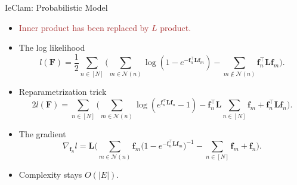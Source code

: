 \documentclass{beamer}
\newcommand{\sumgraph}{\underset{n \in [N]}{\sum}}
\def \sumneighbors {\underset {m\in{\mathcal{N}(n)}}{\sum}}
\def \sumstrangers{\underset {m\notin{\mathcal{N}(n)}}{\sum}}
\def \sumgraphu {\underset{n\in [N]}{ \sum}}
\begin{document}
\begin{frame}{IeClam: Probabilistic Model}
    \begin{itemize}[itemsep=1em, label=\textbullet]   
    \item \textcolor{brown}{Inner product has been replaced by $L$ product.}
    \item The log likelihood
    \[ l(\mathbf{F}) = \frac{1}{2}\sumgraph \Big(\sumneighbors{}{\log(1-e^{-\mathbf{f}_n^\top \mathbf{L} \mathbf{f}_m})} - 
 \sumstrangers{\mathbf{f}_n^\top \mathbf{L} \mathbf{f}_m}\Big).\]%
 
\item Reparametrization trick \[2l(\mathbf{F})=
   \sumgraphu \Big(\sumneighbors{\log(e^{\mathbf{f}_n^\top  \mathbf{L} \mathbf{f}_n} - 1)}  - \mathbf{f}_n^\top \mathbf{L} {\sumgraph{\mathbf{f}_m}} + \mathbf{f}_n^\top \mathbf{L} \mathbf{f}_n \Big).\]%
\item The gradient  
\[ \nabla_{\mathbf{f}_n}l = 
    \mathbf{L}\bigg(\sumneighbors{\mathbf{f}_m \big(1-e^{-\mathbf{f}_n^\top \mathbf{L} \mathbf{f}_m}
    \big)^{-1}} - \sumgraph{\mathbf{f}_m} + \mathbf{f}_n \bigg).\]%
\item Complexity stays $O(|E|)$.
    \end{itemize}
        
    \end{frame}
\end{document}
